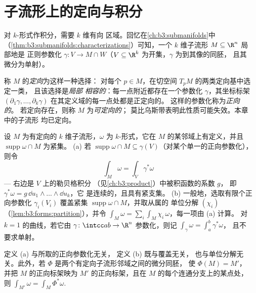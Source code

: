 \section{子流形上的定向与积分}

对 $k$-形式作积分，需要 $k$ 维有向
区域。回忆在\cref{ch:b3:submanifolds}中
（\cref{thm:b3:submanifolds:characterizations}）可知，一个
$k$ 维子流形 $M \subseteq \R^n$ 局部地是
正则参数化 $\gamma\colon V \to M \cap W$（$V
\subseteq \R^k$ 为开集，$\gamma$ 为到其像的同胚，
且其微分为单射）。

\begin{definition}\label{def:b3:forms:orientation}
称 $M$ 的\emph{定向}为这样一种选择：
对每个 $p \in M$，在切空间 $T_pM$ 的两类定向基中选定一类，
且该选择是\emph{局部
相容的}：每一点附近都存在一个参数化
$\gamma$，其坐标标架 $(\partial_1\gamma, \dots,
\partial_k\gamma)$ 在其定义域的每一点处都是正定向的。
这样的参数化称为\emph{正向的}。
若定向存在，则称 $M$ 为\emph{可定向的}；
莫比乌斯带表明此性质可能失效。本章中的子流形
均已定向。
\end{definition}

\begin{definition}[形式的积分]\label{def:b3:forms:integral}
设 $M$ 为有定向的 $k$ 维子流形，$\omega$ 为
$k$-形式，它在 $M$ 的某邻域上有定义，并且
$\operatorname{supp}\omega \cap M$ 为紧集。
(a) 若 $\operatorname{supp}\omega \cap M \subseteq
\gamma(V)$（对某个单一的正向参数化），则令
\[
\int_M\omega = \int_V\gamma^*\omega
\]
--- 右边是 $V$ 上的勒贝格积分
（见\cref{ch:b3:product}）中被积函数的系数 $g$，
即 $\gamma^*\omega = g\,\dd u_1\wedge\dots\wedge\dd u_k$，它
是连续的，且具有紧支集。
(b) 一般地，选取有限个正向参数化
$\gamma_i(V_i)$ 覆盖紧集
$\operatorname{supp}\omega \cap M$，并取从属的
单位分解 $(\chi_i)$
（\cref{lem:b3:forms:partition}），并令 $\int_M\omega =
\sum_i\int_M\chi_i\,\omega$，每一项由 (a) 计算。
对 $k = 1$ 的曲线，若它由
$\gamma\colon\intcc ab\to\R^n$ 参数化，则记
$\int_\gamma\omega = \int_a^b\gamma^*\omega$，
且不要求单射。
\end{definition}

\begin{lemma}[相容性]\label{lem:b3:forms:consistency}
定义 (a) 与所取的正向参数化无关，
定义 (b) 既与覆盖无关，
也与单位分解无关。此外，若
$\Phi$ 是两个有定向子流形邻域之间的微分同胚，
使 $\Phi(M) = M'$，并把
$M$ 的正向标架映为 $M'$ 的正向标架，且在
$M$ 的每个连通分支上的某点处，则 $\int_{M'}\omega =
\int_M\Phi^*\omega$.
\end{lemma}


